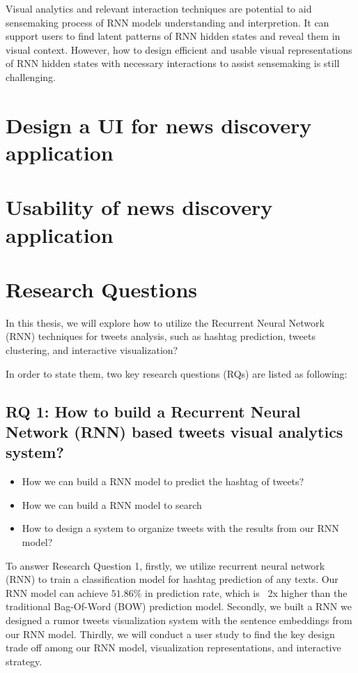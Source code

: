 Visual analytics and relevant interaction techniques are potential to aid sensemaking process \cite{Pirolli2005} of RNN models understanding and interpretion. It can support users to find latent patterns of RNN hidden states and reveal them in visual context. However, how to design efficient and usable visual representations of RNN hidden states with necessary interactions to assist sensemaking is still challenging.


\section{Design a UI for news discovery application}

\section{Usability of news discovery application}

\section{Research Questions}

In this thesis, we will explore how to utilize the Recurrent Neural Network (RNN) techniques for tweets analysis, such as hashtag prediction, tweets clustering, and interactive visualization?



In order to state them, two key research questions (RQs) are listed as following: 

\subsection{RQ 1: How to build a Recurrent Neural Network (RNN) based tweets visual analytics system?}

\begin{itemize}
    \item How we can build a RNN model to predict the hashtag of tweets?
    \item How we can build a RNN model to search 
    \item How to design a system to organize tweets with the results from our RNN model? 

\end{itemize}

To answer Research Question 1,  firstly, we utilize recurrent neural network (RNN) to train a classification model for hashtag prediction of any texts. Our RNN model can achieve $51.86\%$ in prediction rate, which is ~2x higher than the traditional Bag-Of-Word (BOW) prediction model. Secondly, we built a RNN we designed a rumor tweets visualization system with the sentence embeddings from our RNN model. Thirdly, we will conduct a user study to find the key design trade off among our RNN model, visualization representations, and interactive strategy.

